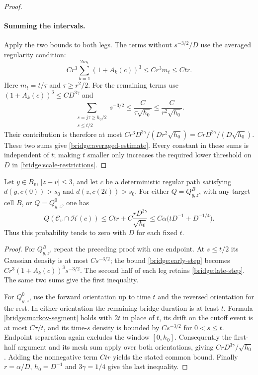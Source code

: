 \begin{proof}
\paragraph{Summing the intervals.}
Apply the two bounds to both legs.  The terms without $s^{-3/2}/D$
use the averaged regularity condition:
\[
 Cr^3\sum_{k=1}^{2m_t}(1+A_k(c))^3
 \le Cr^3m_t\le Ctr.
\]
Here $m_t=t/\tau$ and $\tau\ge r^2/2$.  For the remaining terms use
$(1+A_k(c))^3\le CD^{3\gamma}$ and
\[
 \sum_{\substack{s=j\tau\ge h_0/2\\s\le t/2}}s^{-3/2}
 \le \frac{C}{\tau\sqrt{h_0}}
 \le \frac{C}{r^2\sqrt{h_0}}.
\]
Their contribution is therefore at most
$Cr^3D^{3\gamma}/(Dr^2\sqrt{h_0})
=CrD^{3\gamma}/(D\sqrt{h_0})$.
These two sums give \eqref{bridge:averaged-estimate}.  Every constant in these
sums is independent of $t$; making $t$ smaller only increases the
required lower threshold on $D$ in
\eqref{bridge:scale-restrictions}.
\end{proof}

\begin{proposition}\label{bridge:single-hit}
Let $y\in B_v$, $|z-v|\le3$, and let $c$ be a deterministic regular
path satisfying $d(y,c(0))>s_0$ and $d(z,c(2t))>s_0$.
For either $Q=Q_{y,z}^{B}$, with any target cell $B$, or
$Q=Q_{y,z}^{0}$, one has
\begin{equation}\label{bridge:single-estimate}
 Q(\mathcal C_v\cap\mathcal H(c))
 \le Ctr+C\frac{rD^{3\gamma}}{\sqrt{h_0}}
 \le C\alpha\bigl(tD^{-1}+D^{-1/4}\bigr).
\end{equation}
Thus this probability tends to zero with $D$ for each fixed $t$.
\end{proposition}

\begin{proof}
For $Q_{y,z}^{B}$, repeat the preceding proof with one endpoint.  At
$s\le t/2$ its Gaussian density is at most $Cs^{-3/2}$; the bound
\eqref{bridge:early-step} becomes
$Cr^3(1+A_k(c))^3s^{-3/2}$.  The second half of each leg retains
\eqref{bridge:late-step}.  The same two sums give the first inequality.

For $Q_{y,z}^{0}$, use the forward orientation up to time $t$ and the
reversed orientation for the rest.  In either orientation the
remaining bridge duration is at least $t$.  Formula
\eqref{bridge:markov-segment} holds with $2t$ in place of $t$, its
drift on the cutoff event is at most $C\tau/t$, and its time-$s$
density is bounded by $Cs^{-3/2}$ for $0<s\le t$.  Endpoint separation
again excludes the window $[0,h_0]$.  Consequently the first-half
argument and its mesh sum apply over both orientations, giving
$CrD^{3\gamma}/\sqrt{h_0}$.  Adding the nonnegative term $Ctr$ yields
the stated common bound.  Finally $r=\alpha/D$, $h_0=D^{-1}$ and
$3\gamma=1/4$ give the last inequality.
\end{proof}

